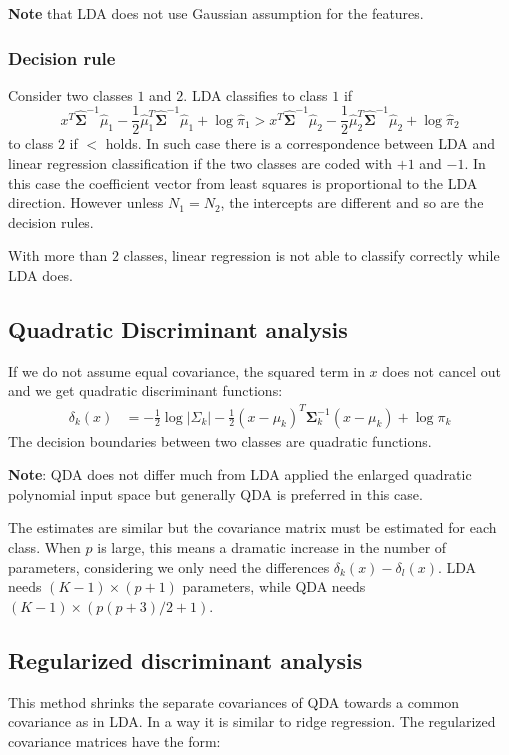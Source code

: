 \documentclass[12pt, letterpaper]{article}
\theoremstyle{definition}
\newcommand{\hsi}{\mathrm{\hat{\mathbf{\Sigma}}}^{-1}}
\newcommand{\si}{\mathbf{\Sigma}^{-1}}
\newcommand{\hmu}{\hat{\mu}}
\newcommand{\hpi}{\hat{\pi}}
\begin{document}
\textbf{Note} that LDA does not use Gaussian assumption for the features.

\subsubsection{Decision rule}
Consider two classes $1$ and $2$. LDA classifies to class $1$ if
\begin{equation}
x^T\hsi \hmu_1 - \frac{1}{2}\hmu_1^T\hsi\hmu_1 + \log \hpi_1 >x^T\hsi \hmu_2 - \frac{1}{2}\hmu_2^T\hsi\hmu_2 + \log \hpi_2
\end{equation}
to class $2$ if $<$ holds. In such case there is a correspondence between LDA and linear regression classification if the two classes are coded with $+1$ and $-1$. In this case the coefficient vector from least squares is proportional to the LDA direction. However unless $N_1=N_2$, the intercepts are different and so are the decision rules.

With more than $2$ classes, linear regression is not able to classify correctly while LDA does.

\subsection{Quadratic Discriminant analysis}
If we do not assume equal covariance, the squared term in $x$ does not cancel out and we get quadratic discriminant functions:
\begin{equation}
\label{QDA}
\begin{aligned}
\delta_k  (x) &= -\frac{1}{2} \log |\Sigma_k| -\frac{1}{2} \left( x - \mu_k \right)^T \si_k\left( x - \mu_k \right) + \log \pi_k
\end{aligned}
\end{equation}
The decision boundaries between two classes are quadratic functions.

\textbf{Note}: QDA does not differ much from LDA applied the enlarged quadratic polynomial input space but generally QDA is preferred in this case.

The estimates are similar but the covariance matrix must be estimated for each class. When $p$ is large, this means a dramatic increase in the number of parameters, considering we only need the differences $\delta_k (x) - \delta_l(x)$. LDA needs $(K-1)\times (p+1)$ parameters, while QDA needs $(K-1) \times \left(p\left(p+3\right)/2 +1\right)$.

\subsection{Regularized discriminant analysis}
This method shrinks the separate covariances of QDA towards a common covariance as in LDA. In a way it is similar to ridge regression. The regularized covariance matrices have the form:
\end{document}
